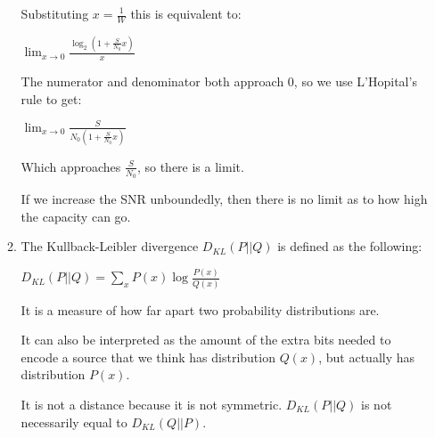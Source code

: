 \begin{enumerate}
\begin{enumerate}
  Substituting $x = \frac{1}{W}$ this is equivalent to:

  $\lim_{x \to 0} \frac{\log_2(1 + \frac{S}{N_0}x)}{x}$

  The numerator and denominator both approach 0, so we use L'Hopital's rule to get:

  $\lim_{x \to 0} \frac{S}{N_0(1 + \frac{S}{N_0}x)}$

  Which approaches $\frac{S}{N_0}$, so there is a limit.

  If we increase the SNR unboundedly, then there is no limit as to how high the capacity can go.

  \item
    The Kullback-Leibler divergence $D_{KL}(P||Q)$ is defined as the following:

    $D_{KL}(P||Q) = \sum_{x} P(x) \log \frac{P(x)}{Q(x)}$

    It is a measure of how far apart two probability distributions are.

    It can also be interpreted as the amount of the extra bits needed to encode a source that we think has distribution $Q(x)$, but actually has distribution $P(x)$.

    It is not a distance because it is  not symmetric. $D_{KL}(P||Q)$ is not necessarily equal to $D_{KL}(Q||P)$.







              \end{enumerate}







        
\end{enumerate}

